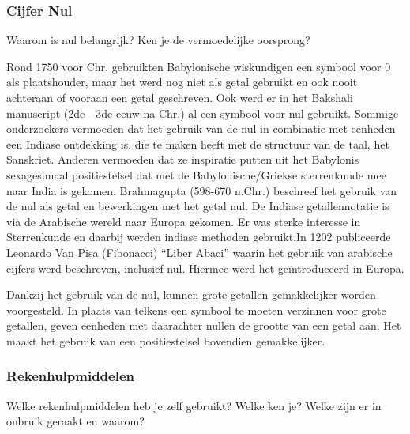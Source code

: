 \documentclass[../main.tex]{subfiles}
\begin{document}
\subsubsection{Cijfer Nul}
\begin{question}
Waarom is nul belangrijk? Ken je de vermoedelijke oorsprong?
\end{question}

\begin{solution}
Rond 1750 voor Chr. gebruikten Babylonische wiskundigen een symbool voor 0 als plaatshouder, maar het werd nog niet als getal gebruikt en ook nooit achteraan of vooraan een getal geschreven. Ook werd er in het Bakshali manuscript (2de - 3de eeuw na Chr.) al een symbool voor nul gebruikt. Sommige onderzoekers vermoeden dat het gebruik  van de nul in combinatie met eenheden een Indiase ontdekking is, die te maken heeft met de structuur van de taal, het Sanskriet. Anderen vermoeden dat ze inspiratie putten uit het Babylonis sexagesimaal positiestelsel dat met de Babylonische/Griekse sterrenkunde mee naar India is gekomen. Brahmagupta (598-670 n.Chr.) beschreef het gebruik van de nul als getal en bewerkingen met het getal nul. De Indiase getallennotatie is via de Arabische wereld naar Europa gekomen. Er was sterke interesse in Sterrenkunde en daarbij werden indiase methoden gebruikt.In 1202 publiceerde Leonardo Van Pisa (Fibonacci) ``Liber Abaci'' waarin het gebruik van arabische cijfers werd beschreven, inclusief nul. Hiermee werd het ge\"introduceerd in Europa.

Dankzij het gebruik van de nul, kunnen grote getallen gemakkelijker worden voorgesteld. In plaats van telkens een symbool te moeten verzinnen voor grote getallen, geven eenheden met daarachter nullen de grootte van een getal aan. Het maakt het gebruik van een positiestelsel bovendien gemakkelijker.



\end{solution}

\subsubsection{Rekenhulpmiddelen}
\begin{question}
Welke rekenhulpmiddelen heb je zelf gebruikt? Welke ken je? Welke zijn er in onbruik geraakt en waarom?
\end{question}
\end{document}
